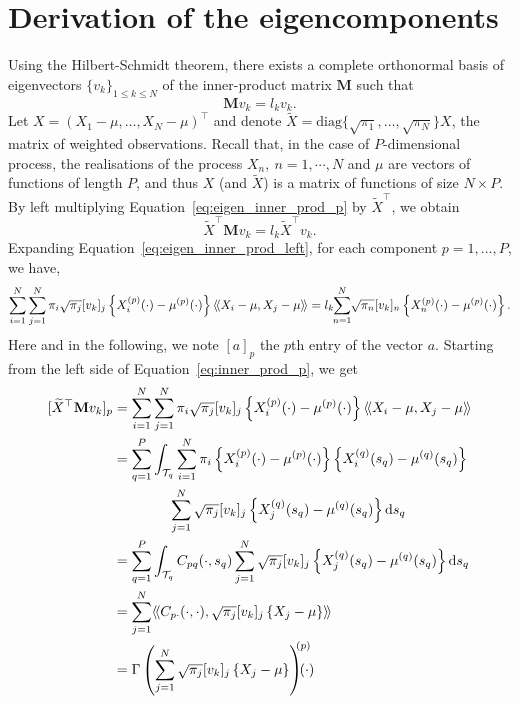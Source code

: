 \section{Derivation of the eigencomponents} %
\label{sec:derivation_of_the_eigencomponents}

Using the Hilbert-Schmidt theorem, there exists a complete orthonormal basis of eigenvectors $\{v_k\}_{1 \leq k \leq N}$ of the inner-product matrix $\mathbf{M}$ such that
\begin{equation}\label{eq:eigen_inner_prod_p}
    \mathbf{M}v_k = l_kv_k.
\end{equation}
Let $X = \left(X_1 - \mu, \dots, X_N - \mu\right)^\top$ and denote $\widetilde{X} = \text{diag}\{\sqrt{\pi_1}, \dots, \sqrt{\pi_N}\}X$, the matrix of weighted observations. Recall that, in the case of $P$-dimensional process, the realisations of the process $X_n,~n = 1, \cdots, N$ and $\mu$ are vectors of functions of length $P$, and thus $X$ (and $\widetilde{X}$) is a matrix of functions of size $N \times P$. By left multiplying Equation~\eqref{eq:eigen_inner_prod_p} by $\widetilde{X}^\top$, we obtain
\begin{equation}\label{eq:eigen_inner_prod_left}
    \widetilde{X}^\top \mathbf{M} v_k = l_k \widetilde{X}^\top v_k.
\end{equation} 
Expanding Equation~\eqref{eq:eigen_inner_prod_left}, for each component $p = 1, \dots, P$, we have,
\begin{equation}\label{eq:inner_prod_p}
    \sum_{i = 1}^N \sum_{j = 1}^N \pi_i \sqrt{\pi_j}[v_{k}]_j\left\{X_i^{(p)}(\cdot) - \mu^{(p)}(\cdot)\right\}\langle\!\langle X_i - \mu, X_j - \mu\rangle\!\rangle = l_k \mkern-5mu\sum_{n = 1}^N \mkern-4mu\sqrt{\pi_n}[v_{k}]_n\left\{X_n^{(p)}(\cdot) - \mu^{(p)}(\cdot)\right\}.
\end{equation}
Here and in the following, we note $[a]_p$ the $p$th entry of the vector $a$. Starting from the left side of Equation~\eqref{eq:inner_prod_p}, we get
\begin{align}\label{eq:inner_prod_p_left}
[\widetilde{X}^\top \mathbf{M} v_k]_p &= \sum_{i = 1}^N \sum_{j = 1}^N \pi_i \sqrt{\pi_j} [v_{k}]_j \left\{X_i^{(p)}(\cdot) - \mu^{(p)}(\cdot)\right\}\inH{X_i - \mu}{X_j - \mu}\\
&= \sum_{q = 1}^P \int_{\TT{q}} \sum_{i = 1}^N \pi_i\left\{X_i^{(p)}(\cdot) - \mu^{(p)}(\cdot)\right\} \left\{X_i^{(q)}(s_q) - \mu^{(q)}(s_q)\right\}  \\
&\qquad\qquad \sum_{j = 1}^N \sqrt{\pi_j}[v_{k}]_j \left\{X_j^{(q)}(s_q) - \mu^{(q)}(s_q)\right\} \dd s_q \\
&= \sum_{q = 1}^P \int_{\TT{q}} C_{pq}(\cdot, s_q)\sum_{j = 1}^N \sqrt{\pi_j}[v_{k}]_j \left\{X_j^{(q)}(s_q) - \mu^{(q)}(s_q)\right\} \dd s_q \\
&= \sum_{j = 1}^N \inH{C_{p \cdot}(\cdot, \cdot)}{\sqrt{\pi_j}[v_{k}]_j \left\{X_j - \mu\right\}} \\
&= \Gamma\left(\sum_{j = 1}^N \sqrt{\pi_j}[v_{k}]_j \left\{X_j - \mu\right\} \right)^{\mkern-9mu(p)}\mkern-18mu(\cdot)
\end{align}
